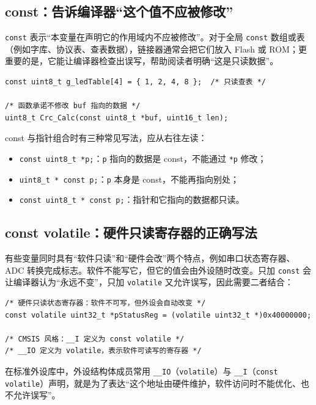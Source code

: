 \subsection{const：告诉编译器“这个值不应被修改”}

\texttt{const} 表示“本变量在声明它的作用域内不应被修改”。对于全局 \texttt{const} 数组或表（例如字库、协议表、查表数据），链接器通常会把它们放入 Flash 或 ROM；更重要的是，它能让编译器检查出误写，帮助阅读者明确“这是只读数据”。

\begin{lstlisting}[style=c]
const uint8_t g_ledTable[4] = { 1, 2, 4, 8 };  /* 只读查表 */

/* 函数承诺不修改 buf 指向的数据 */
uint8_t Crc_Calc(const uint8_t *buf, uint16_t len);
\end{lstlisting}

const 与指针组合时有三种常见写法，应从右往左读：

\begin{itemize}
\item \texttt{const uint8\_t *p;}：\texttt{p} 指向的数据是 const，不能通过 \texttt{*p} 修改；
\item \texttt{uint8\_t * const p;}：\texttt{p} 本身是 const，不能再指向别处；
\item \texttt{const uint8\_t * const p;}：指针和它指向的数据都只读。
\end{itemize}

\subsection{const volatile：硬件只读寄存器的正确写法}

有些变量同时具有“软件只读”和“硬件会改”两个特点，例如串口状态寄存器、ADC 转换完成标志。软件不能写它，但它的值会由外设随时改变。只加 \texttt{const} 会让编译器认为“永远不变”，只加 \texttt{volatile} 又允许误写，因此需要二者结合：

\begin{lstlisting}[style=c]
/* 硬件只读状态寄存器：软件不可写，但外设会自动改变 */
const volatile uint32_t *pStatusReg = (volatile uint32_t *)0x40000000;

/* CMSIS 风格：__I 定义为 const volatile */
/* __IO 定义为 volatile，表示软件可读写的寄存器 */
\end{lstlisting}

在标准外设库中，外设结构体成员常用 \texttt{\_\_IO}（\texttt{volatile}）与 \texttt{\_\_I}（\texttt{const volatile}）声明，就是为了表达“这个地址由硬件维护，软件访问时不能优化、也不允许误写”。

